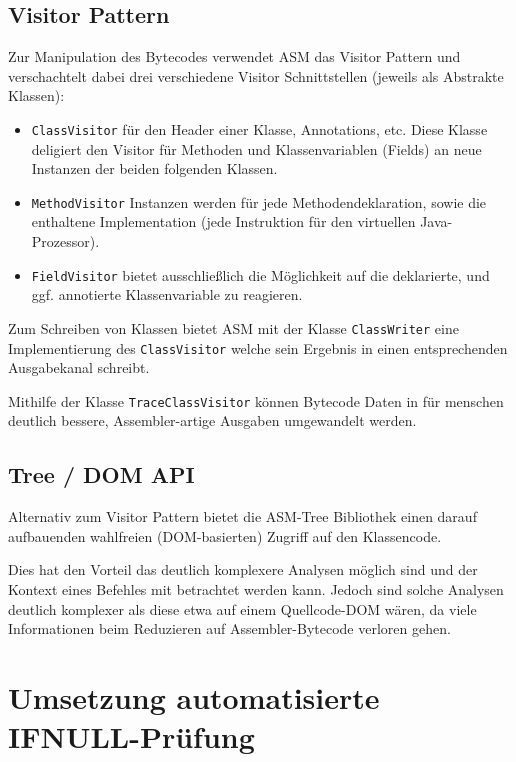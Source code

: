 \subsection{Visitor Pattern}

Zur Manipulation des Bytecodes verwendet ASM das Visitor Pattern und verschachtelt
dabei drei verschiedene Visitor Schnittstellen (jeweils als Abstrakte Klassen):

\begin{itemize}
	\item \texttt{ClassVisitor} für den Header einer Klasse, Annotations, etc.
			Diese Klasse deligiert den Visitor für Methoden und Klassenvariablen (Fields)
			an neue Instanzen der beiden folgenden Klassen.
	\item \texttt{MethodVisitor} Instanzen werden für jede Methodendeklaration,
			sowie die enthaltene Implementation
			(jede Instruktion für den virtuellen Java-Prozessor).
	\item \texttt{FieldVisitor} bietet ausschließlich die Möglichkeit auf die deklarierte,
			und ggf. annotierte Klassenvariable zu reagieren.
\end{itemize}

Zum Schreiben von Klassen bietet ASM mit der Klasse \texttt{ClassWriter} eine
Implementierung des \texttt{ClassVisitor} welche sein Ergebnis in einen entsprechenden
Ausgabekanal schreibt.

Mithilfe der Klasse \texttt{TraceClassVisitor} können Bytecode Daten
in für menschen deutlich bessere, Assembler-artige Ausgaben umgewandelt werden.

\subsection{Tree / DOM API}

Alternativ zum Visitor Pattern bietet die ASM-Tree Bibliothek einen darauf aufbauenden
wahlfreien (DOM-basierten) Zugriff auf den Klassencode.

Dies hat den Vorteil das deutlich komplexere Analysen möglich sind und der
Kontext eines Befehles mit betrachtet werden kann.
Jedoch sind solche Analysen deutlich komplexer als diese etwa auf
einem Quellcode-DOM wären, da viele Informationen beim Reduzieren auf
Assembler-Bytecode verloren gehen.

\section{Umsetzung automatisierte IFNULL-Prüfung}

